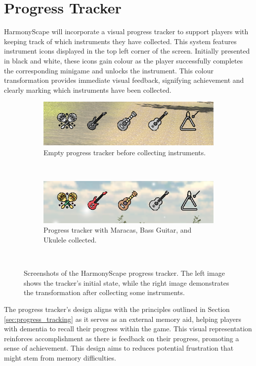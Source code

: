 \documentclass{l4proj}
\begin{document}
\section{Progress Tracker}
HarmonyScape will incorporate a visual progress tracker to support players with keeping track of which instruments they have collected. This system features instrument icons displayed in the top left corner of the screen. Initially presented in black and white, these icons gain colour as the player successfully completes the corresponding minigame and unlocks the instrument. This colour transformation provides immediate visual feedback, signifying achievement and clearly marking which instruments have been collected.

\begin{figure}[h]
  \centering
  \begin{subfigure}[b]{0.45\textwidth}
    \includegraphics[width=\textwidth]{dissertation/images/progress_tracker_empty.png}
    \caption{Empty progress tracker before collecting instruments.}
    \label{fig:progress_empty}
  \end{subfigure}
  ~ 
  \begin{subfigure}[b]{0.45\textwidth}
    \includegraphics[width=\textwidth]{dissertation/images/progress_tracker_partial.png} 
    \caption{Progress tracker with Maracas, Bass Guitar, and Ukulele collected.}
    \label{fig:progress_partial}
  \end{subfigure}
  ~  
  \caption{Screenshots of the HarmonyScape progress tracker. The left image shows the tracker's initial state, while the right image demonstrates the transformation after collecting some instruments.}
  \label{fig:progress_tracker}
\end{figure}

The progress tracker's design aligns with the principles outlined in Section \ref{sec:progress_tracking} as it serves as an external memory aid, helping players with dementia to recall their progress within the game. This visual representation reinforces accomplishment as there is feedback on their progress, promoting a sense of achievement. This design aims to reduces potential frustration that might stem from memory difficulties. 
\end{document}
